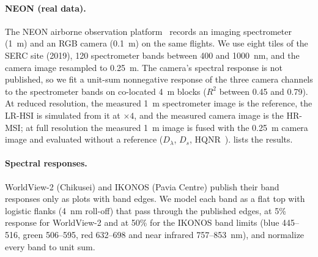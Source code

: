 \documentclass[10pt,twocolumn,letterpaper]{article}
\begin{document}
\paragraph{NEON (real data).} The NEON airborne observation platform~\cite{kampe2010neon} records an imaging spectrometer (1~m) and an RGB camera (0.1~m) on the same flights. We use eight tiles of the SERC site (2019), 120 spectrometer bands between 400 and 1000~nm, and the camera image resampled to 0.25~m. The camera's spectral response is not published, so we fit a unit-sum nonnegative response of the three camera channels to the spectrometer bands on co-located 4~m blocks ($R^2$ between 0.45 and 0.79). At reduced resolution, the measured 1~m spectrometer image is the reference, the LR-HSI is simulated from it at $\times4$, and the measured camera image is the HR-MSI; at full resolution the measured 1~m image is fused with the 0.25~m camera image and evaluated without a reference ($D_\lambda$, $D_s$, HQNR~\cite{alparone2008qnr}).  lists the results.


\paragraph{Spectral responses.} WorldView-2 (Chikusei) and IKONOS (Pavia Centre) publish their band responses only as plots with band edges. We model each band as a flat top with logistic flanks (4~nm roll-off) that pass through the published edges, at 5\% response for WorldView-2 and at 50\% for the IKONOS band limits (blue 445--516, green 506--595, red 632--698 and near infrared 757--853~nm), and normalize every band to unit sum.
\end{document}
